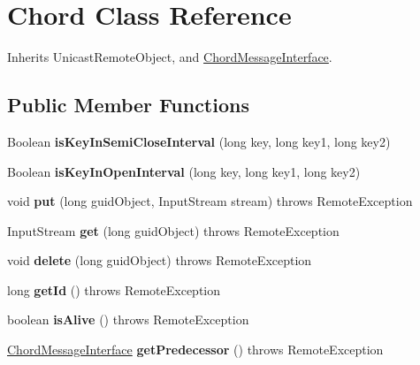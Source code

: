 \hypertarget{class_chord}{}\section{Chord Class Reference}
\label{class_chord}


Inherits Unicast\+Remote\+Object, and \hyperlink{interface_chord_message_interface}{Chord\+Message\+Interface}.

\subsection*{Public Member Functions}
\begin{DoxyCompactItemize}
\item 
\mbox{\label{class_chord_aa0b073bf26ea53ee4c36749b5bde4935}} 
Boolean {\bfseries is\+Key\+In\+Semi\+Close\+Interval} (long key, long key1, long key2)
\item 
\mbox{\label{class_chord_a68c9c3d06da58a6a32aa536751d6a221}} 
Boolean {\bfseries is\+Key\+In\+Open\+Interval} (long key, long key1, long key2)
\item 
\mbox{\label{class_chord_a24d1b07e8c80574244876cf84f86aa4d}} 
void {\bfseries put} (long guid\+Object, Input\+Stream stream)  throws Remote\+Exception 
\item 
\mbox{\label{class_chord_a3e0b4e9a1af09a0604be7eecea716cba}} 
Input\+Stream {\bfseries get} (long guid\+Object)  throws Remote\+Exception 
\item 
\mbox{\label{class_chord_a8bc6bdc9f92665955ae6907f15cc7ea6}} 
void {\bfseries delete} (long guid\+Object)  throws Remote\+Exception 
\item 
\mbox{\label{class_chord_a3dfb600d109b7d23459a3353af0274a9}} 
long {\bfseries get\+Id} ()  throws Remote\+Exception 
\item 
\mbox{\label{class_chord_a0a677ced19cc0cb5afd2a695977aeb95}} 
boolean {\bfseries is\+Alive} ()  throws Remote\+Exception 
\item 
\mbox{\label{class_chord_a3f1aadce3820e808c80662bb61a58e34}} 
\hyperlink{interface_chord_message_interface}{Chord\+Message\+Interface} {\bfseries get\+Predecessor} ()  throws Remote\+Exception 

\end{DoxyCompactItemize}
